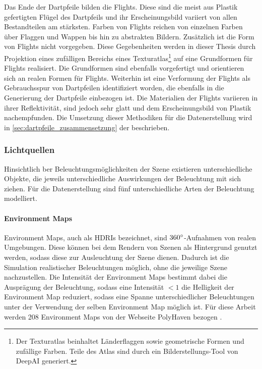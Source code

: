 Das Ende der Dartpfeile bilden die Flights. Diese sind die meist aus Plastik gefertigten Flügel des Dartpfeils und ihr Erscheinungsbild variiert von allen Bestandteilen am stärksten. Farben von Flights reichen von einzelnen Farben über Flaggen und Wappen bis hin zu abstrakten Bildern. Zusätzlich ist die Form von Flights nicht vorgegeben. Diese Gegebenheiten werden in dieser Thesis durch Projektion eines zufälligen Bereichs eines Texturatlas\footnote{Der Texturatlas beinhaltet Länderflaggen sowie geometrische Formen und zufällige Farben. Teile des Atlas sind durch ein Bilderstellungs-Tool von DeepAI \cite{deepai-image} generiert.} auf eine Grundformen für Flights realisiert. Die Grundformen sind ebenfalls vorgefertigt und orientieren sich an realen Formen für Flights. Weiterhin ist eine Verformung der Flights als Gebrauchsspur von Dartpfeilen identifiziert worden, die ebenfalls in die Generierung der Dartpfeile einbezogen ist. Die Materialien der Flights variieren in ihrer Reflektivität, sind jedoch sehr glatt und dem Erscheinungsbild von Plastik nachempfunden. Die Umsetzung dieser Methodiken für die Datenerstellung wird in \autoref{sec:dartpfeile_zusammensetzung} der  beschrieben.

\subsubsection{Lichtquellen}
\label{sec:lichter}

Hinsichtlich ber Beleuchtungsmöglichkeiten der Szene existieren unterschiedliche Objekte, die jeweils unterschiedliche Auswirkungen der Beleuchtung mit sich ziehen. Für die Datenerstellung sind fünf unterschiedliche Arten der Beleuchtung modelliert.

\paragraph{Environment Maps}

Environment Maps, auch als HDRIs bezeichnet, sind $360^{\circ}$-Aufnahmen von realen Umgebungen. Diese können bei dem Rendern von Szenen als Hintergrund genutzt werden, sodass diese zur Ausleuchtung der Szene dienen. Dadurch ist die Simulation realistischer Beleuchtungen möglich, ohne die jeweilige Szene nachzustellen. Die Intensität der Environment Maps bestimmt dabei die Ausprägung der Beleuchtung, sodass eine Intensität $< 1$ die Helligkeit der Environment Map reduziert, sodass eine Spanne unterschiedlicher Beleuchtungen unter der Verwendung der selben Environment Map möglich ist. Für diese Arbeit werden 208 Environment Maps von der Webseite PolyHaven bezogen \cite{polyhaven}.

